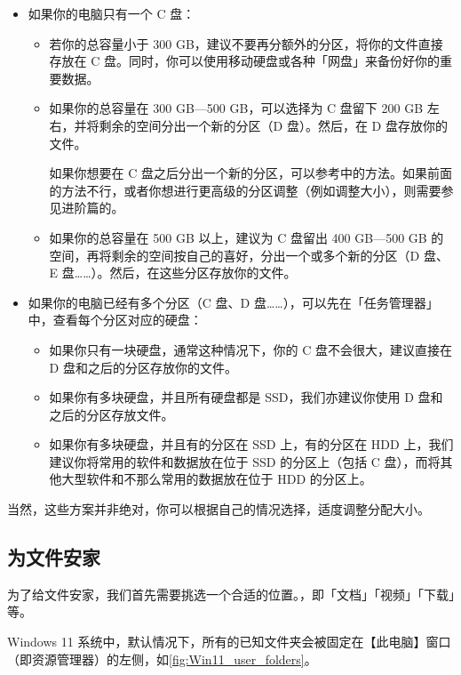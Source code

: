 {{{{\begin{itemize}
  \item 如果你的电脑只有一个 C 盘：
  \begin{itemize}
    \item 若你的总容量小于 300 GB，建议不要再分额外的分区，将你的文件直接存放在 C 盘。同时，你可以使用移动硬盘或各种「网盘」来备份好你的重要数据。
    \item 如果你的总容量在 300 GB—500 GB，可以选择为 C 盘留下 200 GB 左右，并将剩余的空间分出一个新的分区（D 盘）。然后，在 D 盘存放你的文件。
      \begin{note}
        如果你想要在 C 盘之后分出一个新的分区，可以参考中的方法。如果前面的方法不行，或者你想进行更高级的分区调整（例如调整大小），则需要参见进阶篇的。
      \end{note}
    \item 如果你的总容量在 500 GB 以上，建议为 C 盘留出 400 GB—500 GB 的空间，再将剩余的空间按自己的喜好，分出一个或多个新的分区（D 盘、E 盘……）。然后，在这些分区存放你的文件。
  \end{itemize}
  \item 如果你的电脑已经有多个分区（C 盘、D 盘……），可以先在「任务管理器」中，查看每个分区对应的硬盘：
  \begin{itemize}
    \item 如果你只有一块硬盘，通常这种情况下，你的 C 盘不会很大，建议直接在 D 盘和之后的分区存放你的文件。
    \item 如果你有多块硬盘，并且所有硬盘都是 SSD，我们亦建议你使用 D 盘和之后的分区存放文件。
    \item 如果你有多块硬盘，并且有的分区在 SSD 上，有的分区在 HDD 上，我们建议你将常用的软件和数据放在位于 SSD 的分区上（包括 C 盘），而将其他大型软件和不那么常用的数据放在位于 HDD 的分区上。
  \end{itemize}
\end{itemize}

当然，这些方案并非绝对，你可以根据自己的情况选择，适度调整分配大小。

\subsection{为文件安家}

为了给文件安家，我们首先需要挑选一个合适的位置。，即「文档」「视频」「下载」等。

Windows 11 系统中，默认情况下，所有的已知文件夹会被固定在【此电脑】窗口（即资源管理器）的左侧，如\autoref{fig:Win11_user_folders}。

}}}}
